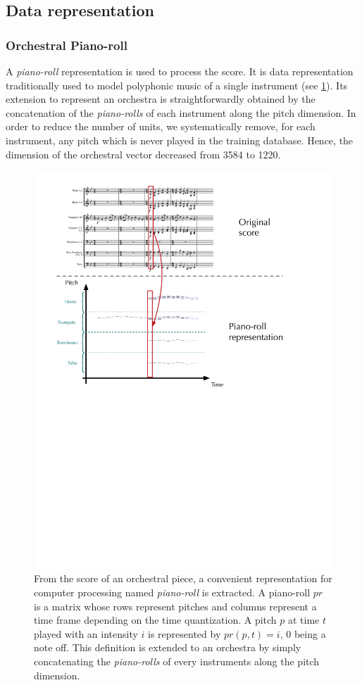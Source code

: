 \documentclass{article}
\begin{document}
\subsection{Data representation}
\subsubsection{Orchestral Piano-roll}
A \textit{piano-roll} representation is used to process the score.  It is  data representation traditionally used to model polyphonic music of a single instrument (see \ref{fig:piano-roll}). 
Its extension to represent an orchestra is straightforwardly obtained by the concatenation of the \textit{piano-rolls} of each instrument along the pitch dimension.
In order to reduce the number of units, we systematically remove, for each instrument, any pitch which is never played in the training database. Hence, the dimension of the orchestral vector decreased from 3584 to 1220.

\begin{figure}[ht]
\centering
\includegraphics[scale=0.37]{Data_representation/from_score_to_pianoroll}
\caption{From the score of an orchestral piece, a convenient representation for computer processing named \textit{piano-roll} is extracted. A piano-roll $pr$ is a matrix whose rows represent pitches and columns represent a time frame depending on the time quantization. A pitch $p$ at time $t$ played with an intensity $i$ is represented by $pr(p,t) = i$, $0$ being a note off. This definition is extended to an orchestra by simply concatenating the \textit{piano-rolls} of every instruments along the pitch dimension.}
\label{fig:piano-roll}
\end{figure}
\end{document}
